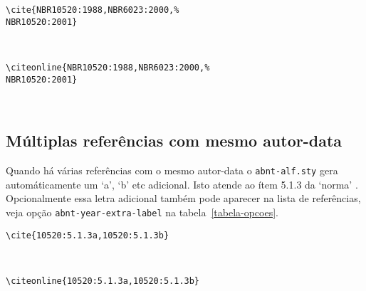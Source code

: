 \documentclass[espacosimples]{abnt}
\newcommand{\VerbL}{0.54\textwidth}
\newcommand{\LatL}{0.45\textwidth}
\begin{document}
\noindent\begin{minipage}[t]{\VerbL}\small\begin{verbatim}
\cite{NBR10520:1988,NBR6023:2000,%
NBR10520:2001}
\end{verbatim}\end{minipage}\begin{minipage}[t]{\LatL}\small
\cite{NBR10520:1988,NBR6023:2000,%
NBR10520:2001}
\end{minipage}\vspace{5mm}\\

\noindent\begin{minipage}[t]{\VerbL}\small\begin{verbatim}
\citeonline{NBR10520:1988,NBR6023:2000,%
NBR10520:2001}
\end{verbatim}\end{minipage}\begin{minipage}[t]{\LatL}\small
{}
\end{minipage}\vspace{5mm}\\

\subsection{Múltiplas referências com mesmo autor-data}
\label{mult-abc}
Quando há várias referências com o mesmo autor-data o {\tt abnt-alf.sty}
gera automáticamente um `a', `b' etc adicional. Isto atende ao ítem
5.1.3 da `norma' \cite{NBR10520:2001}.
Opcionalmente essa letra adicional também pode aparecer na lista de
referências, veja opção {\tt abnt-year-extra-label} na tabela~\ref{tabela-opcoes}.

\noindent\begin{minipage}[t]{\VerbL}\small\begin{verbatim}
\cite{10520:5.1.3a,10520:5.1.3b}
\end{verbatim}\end{minipage}\begin{minipage}[t]{\LatL}\small
\cite{10520:5.1.3a,10520:5.1.3b}
\end{minipage}\vspace{5mm}\\

\noindent\begin{minipage}[t]{\VerbL}\small\begin{verbatim}
\citeonline{10520:5.1.3a,10520:5.1.3b}
\end{verbatim}\end{minipage}\begin{minipage}[t]{\LatL}\small
{}
\end{minipage}\vspace{5mm}\\
\end{document}
